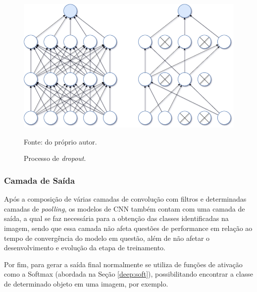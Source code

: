 \begin{figure}[H]
    \centering
    \caption{Processo de \textit{dropout}.}
    \includegraphics[width=1\linewidth]{recursos/imagens/deep/dropout.png}
    \label{deep:fig:9}
    
    \vspace*{1 cm}
     Fonte: do próprio autor.
\end{figure}


\subsubsection{Camada de Saída}
\label{deep:output}

Após a composição de várias camadas de convolução com filtros e determinadas camadas de \textit{poolling}, os modelos de CNN também contam com uma camada de saída, a qual se faz necessária para a obtenção das classes identificadas na imagem, sendo que essa camada não afeta questões de performance em relação ao tempo de convergência do modelo em questão, além de não afetar o desenvolvimento e evolução da etapa de treinamento.

Por fim, para gerar a saída final normalmente se utiliza de funções de ativação como a Softmax (abordada na Seção \ref{deep:soft}), possibilitando encontrar a classe de determinado objeto em uma imagem, por exemplo.